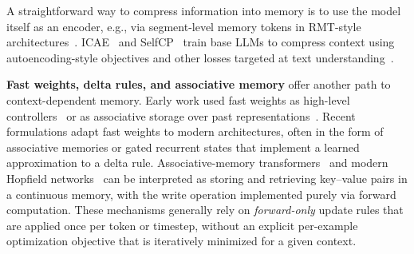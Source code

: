 \documentclass{article}
\theoremstyle{plain}
\theoremstyle{definition}
\theoremstyle{remark}
\begin{document}
{A straightforward way to compress information into memory is to use the model itself as an encoder, e.g., via segment-level memory tokens in RMT-style architectures~\citep{rmt_2022, chevalier2023adapting, gao2024selfcp}.
ICAE~\citep{ge2023incontext} and SelfCP~\citep{gao2024selfcp} train base LLMs to compress context using autoencoding-style objectives and other losses targeted at text understanding~\citep{li2024500xcompressor}.

\textbf{Fast weights, delta rules, and associative memory} offer another path to context-dependent memory.
Early work used fast weights as high-level controllers~\citep{schmidhuber1992learning} or as associative storage over past representations~\citep{hinton1987using}.
Recent formulations adapt fast weights to modern architectures, often in the form of associative memories or gated recurrent states that implement a learned approximation to a delta rule.
Associative-memory transformers~\citep{rodkin2024associative} and modern Hopfield networks~\citep{ramsauer2020hopfield} can be interpreted as storing and retrieving key--value pairs in a continuous memory, with the write operation implemented purely via forward computation.
These mechanisms generally rely on \emph{forward-only} update rules that are applied once per token or timestep, without an explicit per-example optimization objective that is iteratively minimized for a given context.

}
\end{document}
